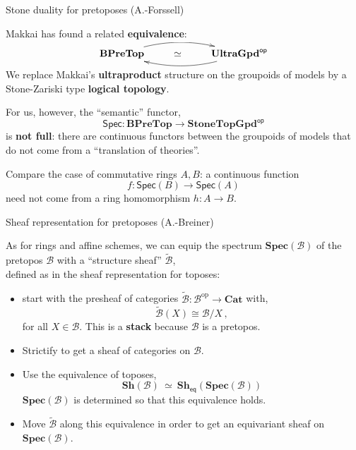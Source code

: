 \documentclass{beamer}
\newcommand{\B}{\ensuremath{\mathcal{B}}}
\newcommand{\myemph}[1]{\textbf{#1}}    %
\begin{document}
\begin{frame}{Stone duality for pretoposes (A.-Forssell)}

Makkai has found a related \myemph{equivalence}:
\[
\xymatrix{ 
\mathbf{BPreTop}  \ar@/{}^{1pc}/[rr]     & \simeq &  \mathbf{UltraGpd}^{\mathsf{op}}  \ar@/{}^{1pc}/[ll] \\
} 
\]
We replace Makkai's \myemph{ultraproduct} structure on the groupoids of models by a Stone-Zariski type \myemph{logical topology}.
\medskip

For us, however, the ``semantic'' functor,
\[
\mathsf{Spec} : \mathbf{BPreTop} \longrightarrow \mathbf{StoneTopGpd}^{\mathsf{op}}
\]
 is \myemph{not full}: there are continuous functors between the groupoids of models that do not come from a ``translation of theories''.
\medskip

Compare the case of commutative rings $A, B$:  a continuous function $$f : \mathsf{Spec}(B) \to \mathsf{Spec}(A)$$ need not come from a ring homomorphism $h : A\to B$. 

\end{frame}
\begin{frame}{Sheaf representation for pretoposes (A.-Breiner)}

As for rings and affine schemes, we can equip the spectrum $\mathbf{Spec}(\mathcal{B})$ of the pretopos $\mathcal{B}$ with a ``structure sheaf'' $\tilde{\mathcal{B}}$,\\
  defined as in the sheaf representation for toposes: 
\begin{itemize}
\item start with the presheaf of categories $\tilde{\mathcal{B}} : \mathcal{B}^{\mathrm{op}}\to\mathbf{Cat}$ with,
\[
\tilde{\mathcal{B}}(X) \cong \mathcal{B}/X\,,
\]
for all $X\in \B$. This is a \myemph{stack} because $\mathcal{B}$ is a pretopos.
 
\item Strictify to get a sheaf of categories on $\mathcal{B}$. 

\item Use the equivalence of toposes,
\[
\mathbf{Sh}(\B)\ \simeq\ \mathbf{Sh}_{\mathsf{eq}}(\mathbf{Spec}(\mathcal{B}))
\]
$\mathbf{Spec}(\mathcal{B})$ is determined so that this equivalence holds.

\item Move $\tilde{\mathcal{B}}$ along this equivalence in order to get an equivariant sheaf on $\mathbf{Spec}(\mathcal{B})$.
\end{itemize}

\end{frame}
\end{document}
